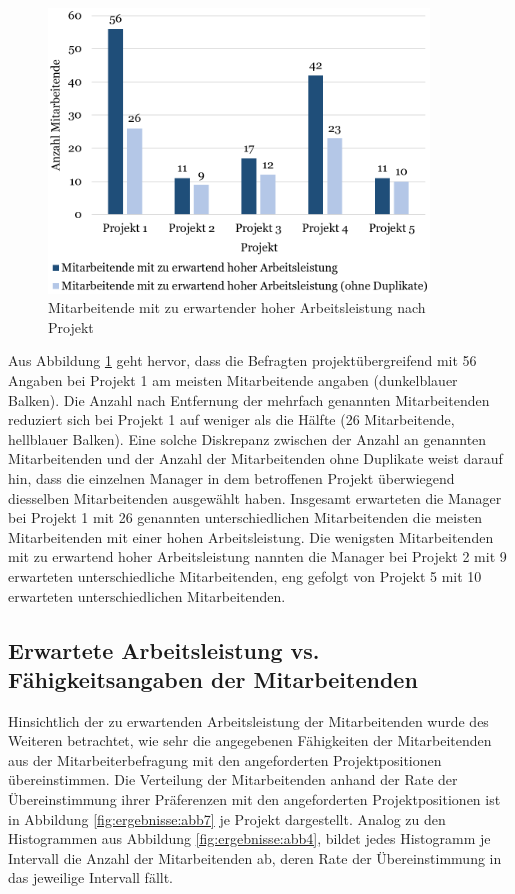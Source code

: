 \begin{figure}
    \centering
	\includegraphics[width=0.9\textwidth]{gfx/verteilung-m-prod.png}
	\caption[Mitarbeitende mit zu erwartender hoher Arbeitsleistung nach Projekt]{Mitarbeitende mit zu erwartender hoher Arbeitsleistung nach Projekt}
	\label{fig:ergebnisse:abb5}
\end{figure}

Aus Abbildung \ref{fig:ergebnisse:abb5} geht hervor, dass die Befragten projektübergreifend mit 56 Angaben bei Projekt 1 am meisten Mitarbeitende angaben (dunkelblauer Balken).
Die Anzahl nach Entfernung der mehrfach genannten Mitarbeitenden reduziert sich bei Projekt 1 auf weniger als die Hälfte (26 Mitarbeitende, hellblauer Balken).
Eine solche Diskrepanz zwischen der Anzahl an genannten Mitarbeitenden und der Anzahl der Mitarbeitenden ohne Duplikate weist darauf hin, dass die einzelnen Manager in dem betroffenen Projekt überwiegend diesselben Mitarbeitenden ausgewählt haben.
Insgesamt erwarteten die Manager bei Projekt 1 mit 26 genannten unterschiedlichen Mitarbeitenden die meisten Mitarbeitenden mit einer hohen Arbeitsleistung.
Die wenigsten Mitarbeitenden mit zu erwartend hoher Arbeitsleistung nannten die Manager bei Projekt 2 mit 9 erwarteten unterschiedliche Mitarbeitenden, eng gefolgt von Projekt 5 mit 10 erwarteten unterschiedlichen Mitarbeitenden.

\subsection{Erwartete Arbeitsleistung vs. Fähigkeitsangaben der Mitarbeitenden}
Hinsichtlich der zu erwartenden Arbeitsleistung der Mitarbeitenden wurde des Weiteren betrachtet, wie sehr die angegebenen Fähigkeiten der Mitarbeitenden aus der Mitarbeiterbefragung mit den angeforderten Projektpositionen übereinstimmen.
Die Verteilung der Mitarbeitenden anhand der Rate der Übereinstimmung ihrer Präferenzen mit den angeforderten Projektpositionen ist in Abbildung \ref{fig:ergebnisse:abb7} je Projekt dargestellt.
Analog zu den Histogrammen aus Abbildung \ref{fig:ergebnisse:abb4}, bildet jedes Histogramm je Intervall die Anzahl der Mitarbeitenden ab, deren Rate der Übereinstimmung in das jeweilige Intervall fällt.

